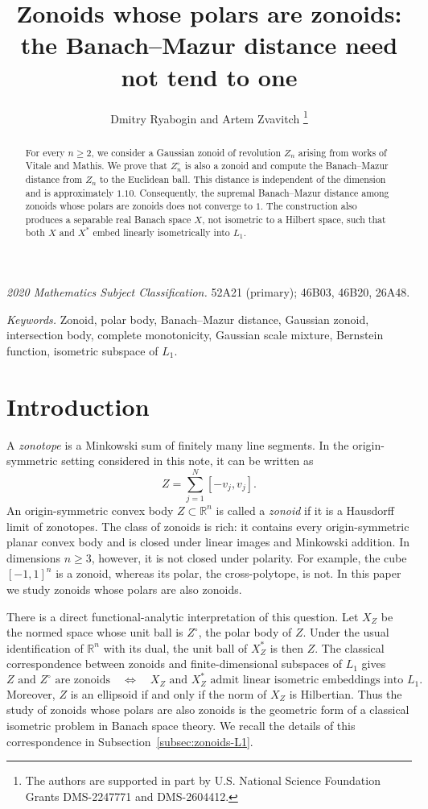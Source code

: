 \documentclass[11pt]{article}
\title{Zonoids whose polars are zonoids:\\
the Banach--Mazur distance need not tend to one}
\author{Dmitry Ryabogin and Artem Zvavitch%
\thanks{The authors are supported in part by U.S. National Science Foundation
Grants DMS-2247771 and DMS-2604412.}}
\date{}
\theoremstyle{definition}
\theoremstyle{remark}
\newcommand{\R}{\mathbb R}
\begin{document}
\maketitle

\begin{abstract}
For every $n\geq2$, we consider a  Gaussian
zonoid of revolution $Z_n$ arising from  works of Vitale and Mathis.  We prove that
$Z_n^\circ$ is also a zonoid and compute the Banach--Mazur distance
from $Z_n$ to the Euclidean ball.  This distance is independent of the
dimension and is approximately $1.10$.  Consequently, the supremal
Banach--Mazur distance among zonoids whose polars are zonoids does not
converge to $1$.   The construction also produces a
separable real Banach space $X$, not isometric to a Hilbert space, such
that both $X$ and $X^*$ embed linearly isometrically into $L_1$.
\end{abstract}

\medskip
\noindent\textit{2020 Mathematics Subject Classification.}
52A21 (primary); 46B03, 46B20, 26A48.

\smallskip
\noindent\textit{Keywords.}
Zonoid, polar body, Banach--Mazur distance, Gaussian zonoid,
intersection body, complete monotonicity, Gaussian scale mixture,
Bernstein function, isometric subspace of $L_1$.

\tableofcontents

\section{Introduction}

A \emph{zonotope} is a Minkowski sum of finitely many line segments.
In the origin-symmetric setting considered in this note, it can be
written as
\[
 Z=\sum_{j=1}^N[-v_j,v_j].
\]
An origin-symmetric convex body $Z\subset\R^n$ is called a
\emph{zonoid} if it is a Hausdorff limit of zonotopes.  The class of
zonoids is rich: it contains every origin-symmetric planar convex body
and is closed under linear images and Minkowski addition.  In
dimensions $n\geq3$, however, it is not closed under polarity.  For
example, the cube $[-1,1]^n$ is a zonoid, whereas its polar, the
cross-polytope, is not. 
 In this paper we study zonoids whose polars are also zonoids.


There is a direct functional-analytic interpretation of this
question.  Let $X_Z$ be the normed space whose unit ball is
$Z^\circ$, the polar body of $Z$.  Under the usual identification of $\R^n$ with its dual,
the unit ball of $X_Z^*$ is then $Z$.  The classical correspondence
between zonoids and finite-dimensional subspaces of $L_1$ gives
\[
 Z\text{ and }Z^\circ\text{ are zonoids}
 \quad\Longleftrightarrow\quad
 X_Z\text{ and }X_Z^*\text{ admit linear isometric embeddings
 into }L_1.
\]
Moreover, $Z$ is an ellipsoid if and only if the norm of $X_Z$ is
Hilbertian.  Thus the study of zonoids whose polars are also zonoids
is the geometric form of a classical isometric problem in Banach
space theory.  We recall the details of this correspondence in
Subsection~\ref{subsec:zonoids-L1}.
\end{document}
